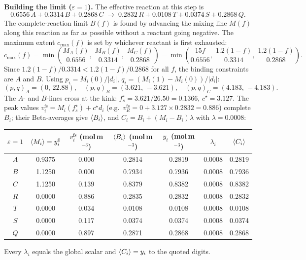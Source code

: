 \documentclass[11pt]{article}
\newcommand{\fs}{f_s^{\star}}
\DeclarePairedDelimiter{\avg}{\langle}{\rangle}
\begin{document}
\textbf{Building the limit (\(\varepsilon=1\)).} The effective reaction at this step is
\[
0.6556\,A + 0.3314\,B + 0.2868\,C \;\longrightarrow\; 0.2832\,R + 0.0108\,T + 0.0374\,S + 0.2868\,Q.
\]
The complete-reaction limit \(B(f)\) is found by advancing the mixing line \(M(f)\)
along this reaction as far as possible without a reactant going negative.  The maximum
extent \(c_{\max}(f)\) is set by whichever reactant is first exhausted:
\[
c_{\max}(f) = \min\!\left(\frac{M_A(f)}{0.6556},\;\frac{M_B(f)}{0.3314},\;\frac{M_C(f)}{0.2868}\right)
= \min\!\left(\frac{15f}{0.6556},\;\frac{1.2(1-f)}{0.3314},\;\frac{1.2(1-f)}{0.2868}\right).
\]
Since \(1.2(1{-}f)/0.3314 < 1.2(1{-}f)/0.2868\) for all \(f\), the binding constraints are
\(A\) and \(B\). Using \(p_i=M_i(0)/|d_i|\), \(q_i=(M_i(1)-M_i(0))/|d_i|\):
\[
(p,q)_A=(0,\,22.88),\quad (p,q)_B=(3.621,\,-3.621),\quad (p,q)_C=(4.183,\,-4.183).
\]
The \(A\)- and \(B\)-lines cross at the kink: \(\fs=3.621/26.50=0.1366\),
\(c^{\star}=3.127\). The peak values \(v^{\mathrm{fs}}_i=M_i(\fs)+c^{\star}d_i\) (e.g.\
\(v^{\mathrm{fs}}_R=0+3.127\times0.2832=0.886\)) complete \(B_i\); their Beta-averages
give \(\avg{B_i}\), and \(C_i=B_i+(M_i-B_i)\lambda\) with \(\lambda=0.0008\):

\begin{center}\small
\begin{tabular}{c|cccccc}
\toprule
\(\varepsilon=1\) & \(\avg{M_i}=y^0_i\) & \(v^{\mathrm{fs}}_i\) (mol\,m\(^{-3}\)) &
\(\avg{B_i}\) (mol\,m\(^{-3}\)) & \(y_i\) (mol\,m\(^{-3}\)) & \(\lambda_i\) &
\(\avg{C_i}\) \\\midrule
\(A\) & 0.9375 & 0.000 & 0.2814 & 0.2819 & 0.0008 & 0.2819 \\
\(B\) & 1.1250 & 0.000 & 0.7934 & 0.7936 & 0.0008 & 0.7936 \\
\(C\) & 1.1250 & 0.139 & 0.8379 & 0.8382 & 0.0008 & 0.8382 \\
\(R\) & 0.0000 & 0.886 & 0.2835 & 0.2832 & 0.0008 & 0.2832 \\
\(T\) & 0.0000 & 0.034 & 0.0108 & 0.0108 & 0.0008 & 0.0108 \\
\(S\) & 0.0000 & 0.117 & 0.0374 & 0.0374 & 0.0008 & 0.0374 \\
\(Q\) & 0.0000 & 0.897 & 0.2871 & 0.2868 & 0.0008 & 0.2868 \\
\bottomrule
\end{tabular}
\end{center}

Every \(\lambda_i\) equals the global scalar and \(\avg{C_i}=y_i\) to the quoted digits.
\end{document}
